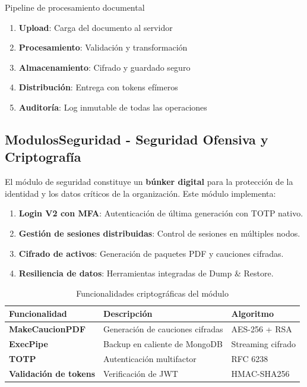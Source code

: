 \begin{caja}{Pipeline de procesamiento documental}
\begin{enumerate}
\item \textbf{Upload}: Carga del documento al servidor
\item \textbf{Procesamiento}: Validación y transformación
\item \textbf{Almacenamiento}: Cifrado y guardado seguro
\item \textbf{Distribución}: Entrega con tokens efímeros
\item \textbf{Auditoría}: Log inmutable de todas las operaciones
\end{enumerate}
\end{caja}

\subsection{ModulosSeguridad - Seguridad Ofensiva y Criptografía}

El módulo de seguridad constituye un \textbf{búnker digital} para la protección de la identidad y los datos críticos de la organización. Este módulo implementa:

\begin{enumerate}
\item \textbf{Login V2 con MFA}: Autenticación de última generación con TOTP nativo.
\item \textbf{Gestión de sesiones distribuidas}: Control de sesiones en múltiples nodos.
\item \textbf{Cifrado de activos}: Generación de paquetes PDF y cauciones cifradas.
\item \textbf{Resiliencia de datos}: Herramientas integradas de Dump \& Restore.
\end{enumerate}

\begin{table}[H]
\centering
\caption{Funcionalidades criptográficas del módulo}
\begin{tabular}{|l|p{6cm}|p{4cm}|}
\hline
\textbf{Funcionalidad} & \textbf{Descripción} & \textbf{Algoritmo} \\ \hline
\textbf{MakeCaucionPDF} & Generación de cauciones cifradas & AES-256 + RSA \\ \hline
\textbf{ExecPipe} & Backup en caliente de MongoDB & Streaming cifrado \\ \hline
\textbf{TOTP} & Autenticación multifactor & RFC 6238 \\ \hline
\textbf{Validación de tokens} & Verificación de JWT & HMAC-SHA256 \\ \hline
\end{tabular}
\end{table}

